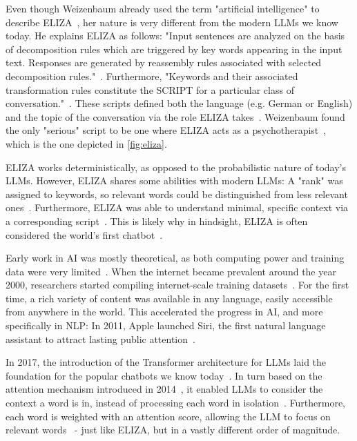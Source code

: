 Even though Weizenbaum already used the term "artificial intelligence" to describe ELIZA~\cite{weizenbaumELIZAComputerProgram1966}, her nature is very different from the modern \glspl{LLM} we know today. He explains ELIZA as follows: "Input sentences are analyzed on the basis of decomposition rules which are triggered by key words appearing in the input text. Responses are generated by reassembly rules associated with selected decomposition rules."~\cite{weizenbaumELIZAComputerProgram1966}. Furthermore, "Keywords and their associated transformation rules constitute the SCRIPT for a particular class of conversation."~\cite{weizenbaumELIZAComputerProgram1966}. These scripts defined both the language (e.g. German or English) and the topic of the conversation via the role ELIZA takes~\cite{weizenbaumELIZAComputerProgram1966}. Weizenbaum found the only "serious" script to be one where ELIZA acts as a psychotherapist~\cite{weizenbaumELIZAComputerProgram1966}, which is the one depicted in \cref{fig:eliza}.

ELIZA works deterministically, as opposed to the probabilistic nature of today's \glspl{LLM}. However, ELIZA shares some abilities with modern \glspl{LLM}: A "rank" was assigned to keywords, so relevant words could be distinguished from less relevant ones~\cite{weizenbaumELIZAComputerProgram1966}. Furthermore, ELIZA was able to understand minimal, specific context via a corresponding script~\cite{weizenbaumELIZAComputerProgram1966}. This is likely why in hindsight, ELIZA is often considered the world's first chatbot~\cite{berryLimitsComputationJoseph2023,shragerELIZAReinterpretedWorlds2024,wangELIZAChatGPTBrief2024}.

Early work in \gls{AI} was mostly theoretical, as both computing power and training data were very limited~\cite{shragerELIZAReinterpretedWorlds2024}. When the internet became prevalent around the year 2000, researchers started compiling internet-scale training datasets~\cite{bankoScalingVeryVery2001,resnikWebParallelCorpus2003,kilgarriffIntroductionSpecialIssue2003}. For the first time, a rich variety of content was available in any language, easily accessible from anywhere in the world. This accelerated the progress in \gls{AI}, and more specifically in \gls{NLP}: In 2011, Apple launched Siri, the first natural language assistant to attract lasting public attention~\cite{wangELIZAChatGPTBrief2024}.

In 2017, the introduction of the Transformer architecture for \glspl{LLM} laid the foundation for the popular chatbots we know today~\cite{vaswaniAttentionAllYou2023}. In turn based on the attention mechanism introduced in 2014~\cite{bahdanauNeuralMachineTranslation2016}, it enabled \glspl{LLM} to consider the context a word is in, instead of processing each word in isolation~\cite{vaswaniAttentionAllYou2023,bahdanauNeuralMachineTranslation2016}. Furthermore, each word is weighted with an attention score, allowing the \gls{LLM} to focus on relevant words~\cite{vaswaniAttentionAllYou2023,bahdanauNeuralMachineTranslation2016} - just like ELIZA, but in a vastly different order of magnitude.

